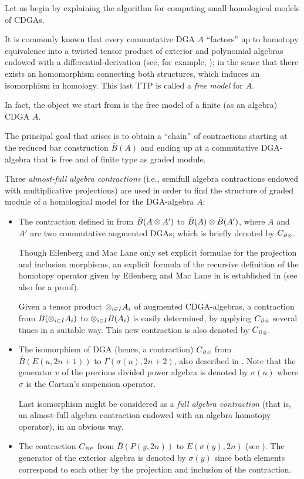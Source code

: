   Let us begin by explaining the algorithm for computing small
  homological models of CDGAs.

It is commonly known that every commutative DGA  $A$ ``factors''
up to homotopy equivalence into a twisted
tensor product of exterior and polynomial
algebras endowed with a
differential-derivation (see, for example, \cite{MCL}); in
the sense that there exists an homomorphism
connecting both structures, which induces an isomorphism in
homology. This last TTP is called a {\em free model} for $A$.

 In fact, the object we start from is the free model of a
finite (as an algebra) CDGA
$A$.

The principal
goal that arises is to obtain a ``chain'' of contractions
starting at the
reduced bar construction $\bar{B}(A)$ and ending up at a
commutative
DGA-algebra that is free and of finite type as graded module.

Three {\it almost-full algebra contractions} (i.e., semifull algebra
contractions endowed with multiplicative projections) are  used in
order to find the structure of graded module of a homological model for the
DGA-algebra $A$:
\begin{itemize}
\item The contraction defined in \cite{EM54} from $\bar{B}(A\otimes A')$ to
$\bar{B}(A)\otimes \bar{B}(A')$, where $A$ and $A'$ are two commutative
augmented DGAs; which is briefly denoted by $C_{\scriptscriptstyle \bar{B}\otimes}$.

Though Eilenberg and Mac Lane only set explicit formulae for the projection
and inclusion morphisms, an explicit formula of the recursive definition of
the homotopy operator given by Eilenberg and Mac Lane in \cite{EM53} is
established in \cite{RUBIO} (see also \cite{Rea96a} for a proof).



Given a tensor product $\otimes _{i\in I}A_i$ of augmented CDGA-algebras, a
contraction from $\bar{B}(\otimes_{i\in I}A_i)$ to $\otimes_{i\in I}\bar{B}(A_i)$ is
easily determined, by applying $C_{\scriptscriptstyle \bar{B}\otimes}$ several times in
a suitable way. This new contraction is also denoted by $C_{\scriptscriptstyle
\bar{B}\otimes}$.



\item The isomorphism of DGA (hence, a contraction) $C_{\scriptscriptstyle
\bar{B}E}$ from $\bar{B}(E(u, 2n+1))$ to $\Gamma (\sigma (u), 2n+2)$, also
described in \cite{EM54}. Note that the generator $v$ of the previous
divided power algebra is denoted by $\sigma (u)$ where $\sigma$ is the Cartan's suspension
operator.

Last isomorphism might be considered as a {\it full algebra contraction}
(that is, an almost-full algebra contraction endowed with an algebra
homotopy operator), in an obvious way.

\item The contraction $C_{\scriptscriptstyle \bar{B}P}$ from $\bar{B}(P(y,2n))$ to
$E(\sigma (y),2n)$ (see \cite{EM54}). The generator of the exterior algebra is
denoted by $\sigma (y)$ since both elements correspond  to each other
by the projection and inclusion of the contraction.
\end{itemize}

